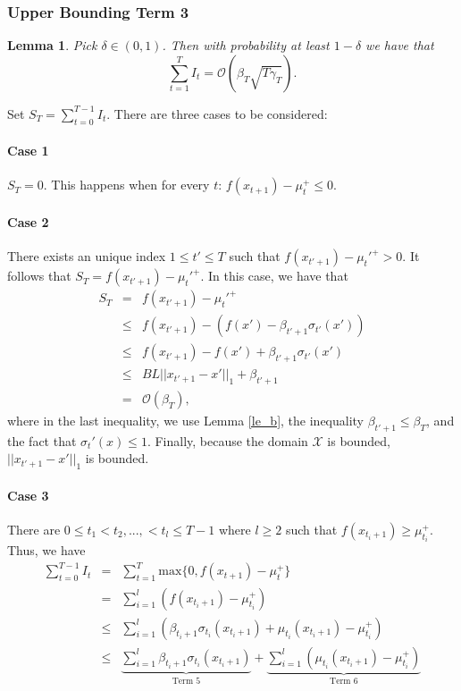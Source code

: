 \documentclass[twoside]{article}
\newtheorem{lemma}{Lemma}
\newenvironment{proof*}[1][\proofname]{
  \renewcommand\qedsymbol{\rule{2.5mm}{2.5mm}}
  \begin{proof}[#1]}{\end{proof}}
\begin{document}
\subsubsection{Upper Bounding Term 3}
\begin{lemma}
Pick $\delta \in (0,1)$. Then with probability at least $1 - \delta$ we have that
$$\sum_{t=1}^{T} I_t = \mathcal O(\beta_T  \sqrt{T\gamma_T}).$$ \label{lem_key}
\end{lemma}
\begin{proof*}
Set $S_T = \sum_{t=0}^{T-1} I_t$. There are three cases to be considered:
\paragraph{Case 1} $S_T = 0$. This happens when for every $t$: $f(x_{t+1}) - \mu_t^+ \le 0$.
\paragraph{Case 2} There exists an unique index $1 \le t'\le T$ such that $f(x_{t'+1}) - \mu_t'^+ > 0$. It follows that $S_T = f(x_{t'+1}) - \mu_t'^+$. In this case, we have that
\begin{eqnarray*}
S_T  & = & f(x_{t'+1}) - \mu_t'^+ \\
& \le & f(x_{t'+1}) - (f(x') - \beta_{t'+1}\sigma_{t'}(x')) \\
& \le & f(x_{t'+1}) - f(x') + \beta_{t'+1}\sigma_{t'}(x') \\
& \le &  BL ||x_{t' + 1} - x'||_1 + \beta_{t'+1}\\
& = & \mathcal O(\beta_T),
\end{eqnarray*}
where in the last inequality, we use Lemma \ref{le_b}, the inequality $\beta_{t'+1} \le \beta_T$, and the fact that $\sigma_t'(x) \le 1$. Finally, because the domain $\mathcal X$ is bounded, $||x_{t' + 1} - x'||_1$ is bounded.

\paragraph{Case 3} There are $0 \le t_1 < t_2, ..., < t_l \le T-1$ where $l \ge 2$ such that $f(x_{t_i +1}) \ge \mu_{t_i}^+$. Thus, we have
\begin{eqnarray*}
\sum_{t=0}^{T-1} I_t & = & \sum_{t=1}^{T} \text{max}\{0, f(x_{t+1}) - \mu_t^+\} \\
& = & \sum_{i = 1}^{l} (f(x_{t_i +1}) - \mu_{t_i}^+) \\
& \le & \sum_{i = 1}^{l} (\beta_{t_i+1} \sigma_{t_i}(x_{t_i +1}) + \mu_{t_i}(x_{t_i +1}) - \mu_{t_i}^+) \\
& \le & \underbrace{\sum_{i = 1}^{l} \beta_{t_i+1} \sigma_{t_i}(x_{t_i +1})}_{\text{Term 5}} +  \underbrace{\sum_{i = 1}^{l}(\mu_{t_i}(x_{t_i +1}) - \mu_{t_i}^+)}_{\text{Term 6}}
\end{eqnarray*}

\end{proof*}
\end{document}
